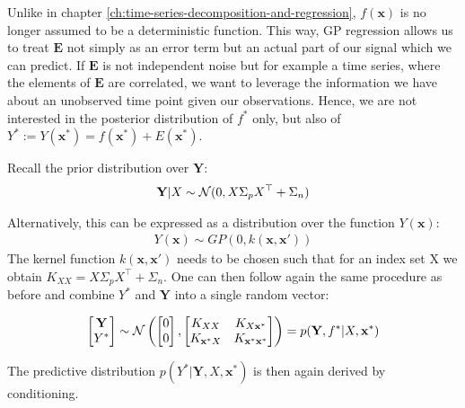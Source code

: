 Unlike in chapter \ref{ch:time-series-decomposition-and-regression}, $f(\mathbf{x})$ is no longer assumed to be a
deterministic function. This way, GP regression allows us to treat $\mathbf{E}$ not simply as an error term but an actual part of
our signal which we can predict. If $\mathbf{E}$ is not independent noise but for example a time series, where
the elements of $\mathbf{E}$ are correlated, we want to leverage the information we have about an unobserved
time point given our observations.
Hence, we are not interested in the posterior distribution of $f^{\ast}$ only, but also of
$Y^{\ast} := Y(\mathbf{x}^{\ast}) = f(\mathbf{x}^{\ast}) + E(\mathbf{x}^{\ast})$.

Recall the prior distribution over $\mathbf{Y}$:
\begin{gather*}
    \mathbf{Y}|X \sim \operatorname{\mathcal{N}}(0,  X \Sigma_p X^{\top} + \Sigma_n) \\
\end{gather*}

Alternatively, this can be expressed as a distribution over the function $Y(\mathbf{x})$:
\begin{gather*}
    Y(\mathbf{x}) \sim GP(0, k(\mathbf{x}, \mathbf{x}'))
\end{gather*}
The kernel function $k(\mathbf{x},\mathbf{x}')$ needs to be chosen such that for an index set X we obtain $K_{XX} =  X \Sigma_p X^{\top} + \Sigma_n$.
One can then follow again the same procedure as before and combine $Y^{\ast}$ and $\mathbf{Y}$ into a single random vector:

\begin{gather}
    \begin{bmatrix}
        \mathbf{Y} \\
        Y^{\ast}
    \end{bmatrix}
    \sim \operatorname{\mathcal{N}} \left(
        \begin{bmatrix}
        0 \\
        0
        \end{bmatrix},
        \begin{bmatrix}
        K_{XX} & K_{X\mathbf{x}^{\ast}} \\
        K_{\mathbf{x}^{\ast}X} & K_{\mathbf{x}^{\ast}\mathbf{x}^{\ast}}
        \end{bmatrix}
        \right)
    = p(\mathbf{Y}, f^{\ast}| X, \mathbf{x}^{\ast})
\end{gather}

The predictive distribution $p(Y^{\ast} | \mathbf{Y}, X, \mathbf{x}^{\ast})$ is then again derived by conditioning.

